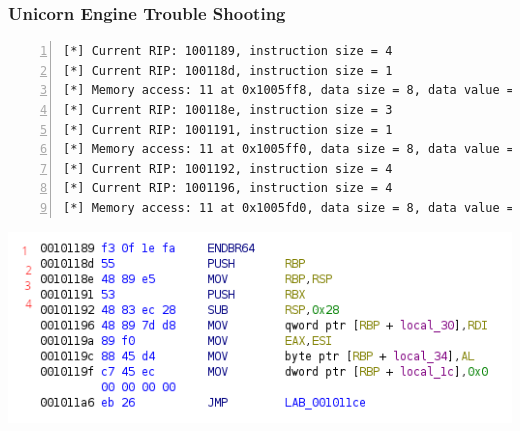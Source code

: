 \begin{frame}[fragile]
\frametitle{Unicorn Engine Trouble Shooting}
\begin{minipage}{0.5\textwidth}
\begin{lstlisting}[basicstyle=\ttfamily\scriptsize,numbers=left, numberstyle=\tiny]
[*] Current RIP: 1001189, instruction size = 4
[*] Current RIP: 100118d, instruction size = 1
[*] Memory access: 11 at 0x1005ff8, data size = 8, data value = 0x0
[*] Current RIP: 100118e, instruction size = 3
[*] Current RIP: 1001191, instruction size = 1
[*] Memory access: 11 at 0x1005ff0, data size = 8, data value = 0x0
[*] Current RIP: 1001192, instruction size = 4
[*] Current RIP: 1001196, instruction size = 4
[*] Memory access: 11 at 0x1005fd0, data size = 8, data value = 0x1004000
\end{lstlisting}
\end{minipage}%
\hfill
\begin{minipage}{0.4\textwidth}
\centering
\includegraphics[scale=0.4]{img/block.png}
\end{minipage}
\end{frame}
